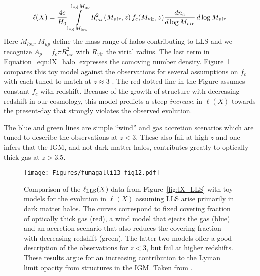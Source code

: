 \documentclass[graybox]{svmult}
\def\intl{\int\limits}
\begin{document}
\begin{equation}
\ell(X) = \frac{4c}{H_0} \intl_{\log M_{\rm low}}^{\log M_{\rm up}}
R_{vir}^2 (M_{vir}, z) \, f_c(M_{\rm vir}, z) 
\frac{d n_c}{d \log M_{vir}} \, d\log M_{vir}
\label{eqn:lX_halo}
\end{equation}
Here $M_{low}, M_{up}$ define the mass range of halos contributing to LLS
and we recognize $A_p = f_c \pi R_{vir}^2$
with $R_{vir}$ the virial radius.
The last term in Equation~\ref{eqn:lX_halo}
expresses the comoving number density.
Figure~\ref{fig:f13_fig12} compares this toy model against
the observations for several assumptions on $f_c$ with each
tuned to match at $z \approx 3$
\cite{fop+13}.  The red dotted line in the Figure assumes
constant $f_c$ with redshift.  Because of the growth of
structure with decreasing redshift in our cosmology,
this model predicts a steep {\it increase} in $\ell(X)$
towards the present-day
that strongly violates the observed evolution.

The blue and green lines are simple ``wind'' and gas accretion
scenarios which are tuned to describe the observations
at $z<3$. These also fail at high-$z$
and one infers that the IGM, and not dark matter halos, contributes
greatly to optically thick gas at $z>3.5$.

%
\begin{figure}[ht]
\sidecaption
\texttt{[image: Figures/fumagalli13\_fig12.pdf]}
%
%
\caption{Comparison of the $\ell_{\rm LLS}(X)$ data from
Figure~\ref{fig:lX_LLS} with toy models for the evolution in
$\ell(X)$ assuming LLS arise primarily in dark matter halos.
The curves correspond to fixed covering fraction
of optically thick gas (red), a wind model that ejects
the gas (blue) and an accretion scenario that also reduces the
covering fraction with decreasing redshift (green).
The latter two models offer a good description of the observations
for $z<3$, but fail at higher redshifts.  These results argue
for an increasing contribution to the Lyman limit opacity
from structures in the IGM.
Taken from \cite{fop+13}.
}
\label{fig:f13_fig12}       %
\end{figure}

\end{document}

